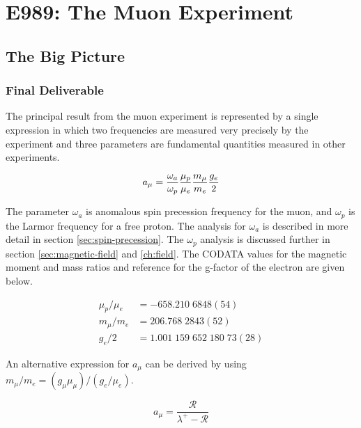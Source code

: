 \chapter {E989: The Muon \gmtwo Experiment} \label{ch:expt}

\section{The Big Picture} \label{sec:expt-big-picture}

\subsection{Final Deliverable}

The principal result from the muon \gmtwo experiment is represented by a single expression in which two frequencies are measured very precisely by the \mugmtwo experiment and three parameters are fundamental quantities measured in other experiments.

\begin{equation}
\label{eqn:g-2-result}
a_\mu = \frac{\omega_a}{\omega_p} \frac{\mu_p}{\mu_e} \\
\frac{m_\mu}{m_e} \frac{g_e}{2}
\end{equation}

\noindent
The parameter $\omega_a$ is anomalous spin precession frequency for the muon, and $\omega_p$ is the Larmor frequency for a free proton.  The analysis for $\omega_a$ is described in more detail in section \ref{sec:spin-precession}.  The $\omega_p$ analysis is discussed further in section \ref{sec:magnetic-field} and \ref{ch:field}.  The CODATA values \cite{codata} for the magnetic moment and mass ratios and reference \cite{g-e-measurement} for the g-factor of the electron are given below.

\begin{align}
\mu_p/\mu_e & = -658.210\;6848(54) \\
m_\mu/m_e & = 206.768\;2843(52) \\
g_e/2 & = 1.001\;159\;652\;180\;73(28)
\end{align}

An alternative expression for $a_\mu$ can be derived by using $m_\mu / m_e = (g_\mu \mu_\mu) / (g_e / \mu_e)$.  

\begin{equation}
\label{eqn:g-2-result-2}
a_\mu = \frac{\mathcal{R}}{\lambda^+ - \mathcal{R}}
\end{equation}

